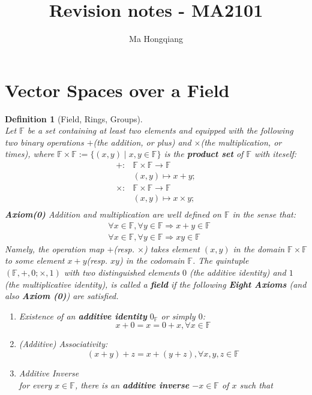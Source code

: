 \documentclass[12pt]{article}
\newtheorem{definition}{Definition}[section]
\theoremstyle{definition}
\begin{document}
\title{Revision notes - MA2101}
\author{Ma Hongqiang}
\maketitle
\tableofcontents

\clearpage
\section{Vector Spaces over a Field}
\begin{definition}[Field, Rings, Groups]
\hfill\\
\normalfont Let $\mathbb{F}$ be a set containing at least two elements and equipped with the following two binary operations $+$(the addition, or plus) and $\times$(the multiplication, or times), where $\mathbb{F}\times\mathbb{F}:=\{(x,y)\mid x,y\in\mathbb{F}\}$ is the \textbf{product set} of $\mathbb{F}$ with iteself:
\[
\begin{aligned}
+:&\mathbb{F}\times\mathbb{F}\to\mathbb{F}\\
&(x,y)\mapsto x+y;\\
\times :&\mathbb{F}\times\mathbb{F}\to\mathbb{F}\\
&(x,y)\mapsto x\times y;\\
\end{aligned}
\]
\textbf{Axiom(0)} Addition and multiplication are well defined on $\mathbb{F}$ in the sense that:
\[
\begin{aligned}
&\forall x\in\mathbb{F}, \forall y\in\mathbb{F}\Rightarrow x+y\in\mathbb{F}\\
&\forall x\in\mathbb{F}, \forall y\in\mathbb{F}\Rightarrow xy\in\mathbb{F}
\end{aligned}
\]
Namely, the operation map $+$(resp. $\times$) takes element $(x,y)$ in the domain $\mathbb{F}\times\mathbb{F}$ to some element $x+y$(resp. $xy$) in the codomain $\mathbb{F}$.
The quintuple $(\mathbb{F},+,0;\times,1)$ with two distinguished elements $0$ (the additive identity) and $1$ (the multiplicative identity), is called a \textbf{field} if the following \textbf{Eight Axioms} (and also \textbf{Axiom (0)}) are satisfied.
\begin{enumerate}[label=(\arabic*)]
\item Existence of an \textbf{additive identity} $0_{\mathbb{F}}$ or simply $0$:
\[
x+0=x=0+x,\forall x\in\mathbb{F}
\]
\item (Additive) Associativity:
\[
(x+y)+z=x+(y+z),\forall x,y,z\in\mathbb{F}
\]
\item Additive Inverse\\for every $x\in\mathbb{F}$, there is an \textbf{additive inverse} $-x\in\mathbb{F}$ of $x$ such that 

\end{enumerate}
\end{definition}
\end{document}
